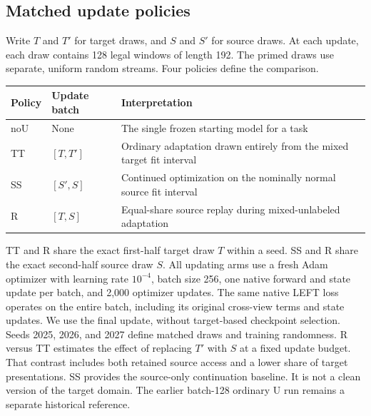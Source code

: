 \documentclass[
  american,
]{article}
\begin{document}
\subsection{Matched update policies}\label{matched-update-policies}

Write \(T\) and \(T'\) for target draws, and \(S\) and \(S'\) for source
draws. At each update, each draw contains 128 legal windows of length
192. The primed draws use separate, uniform random streams. Four
policies define the comparison.

\begin{longtable}[]{@{}
  >{\raggedright\arraybackslash}p{}
  >{\raggedright\arraybackslash}p{}
  >{\raggedright\arraybackslash}p{}@{}}
\toprule\noalign{}
\begin{minipage}[b]{\linewidth}\raggedright
Policy
\end{minipage} & \begin{minipage}[b]{\linewidth}\raggedright
Update batch
\end{minipage} & \begin{minipage}[b]{\linewidth}\raggedright
Interpretation
\end{minipage} \\
\midrule\noalign{}
\endhead
\bottomrule\noalign{}
\endlastfoot
noU & None & The single frozen starting model for a task \\
TT & \([T,T']\) & Ordinary adaptation drawn entirely from the mixed
target fit interval \\
SS & \([S',S]\) & Continued optimization on the nominally normal source
fit interval \\
R & \([T,S]\) & Equal-share source replay during mixed-unlabeled
adaptation \\
\end{longtable}

TT and R share the exact first-half target draw \(T\) within a seed. SS
and R share the exact second-half source draw \(S\). All updating arms
use a fresh Adam optimizer with learning rate \(10^{-4}\), batch size
256, one native forward and state update per batch, and 2,000 optimizer
updates. The same native LEFT loss operates on the entire batch,
including its original cross-view terms and state updates. We use the
final update, without target-based checkpoint selection. Seeds 2025,
2026, and 2027 define matched draws and training randomness. R versus TT
estimates the effect of replacing \(T'\) with \(S\) at a fixed update
budget. That contrast includes both retained source access and a lower
share of target presentations. SS provides the source-only continuation
baseline. It is not a clean version of the target domain. The earlier
batch-128 ordinary U run remains a separate historical reference.
\end{document}
